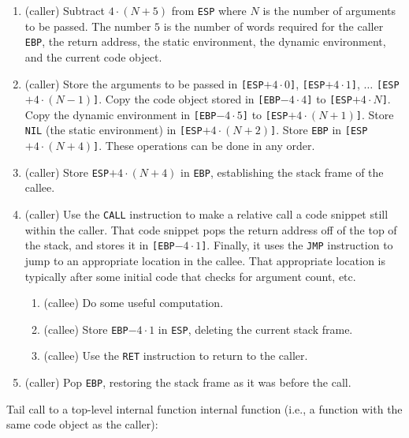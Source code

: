 \begin{enumerate}
\item (caller) Subtract $4 \cdot (N + 5)$ from \texttt{ESP} where $N$
  is the number of arguments to be passed.  The number $5$ is the
  number of words required for the caller \texttt{EBP}, the return
  address, the static environment, the dynamic environment, and the
  current code object.
\item (caller) Store the arguments to be passed in
  \texttt{[ESP$+ 4 \cdot 0$]}, 
  \texttt{[ESP$+ 4 \cdot 1$]}, 
  $\ldots$
  \texttt{[ESP$+ 4 \cdot (N - 1)$]}.
  Copy the code object stored in
  \texttt{[EBP$- 4 \cdot 4$]} to 
  \texttt{[ESP$+ 4 \cdot N$]}.  
  Copy the dynamic environment in 
  \texttt{[EBP$-4 \cdot 5$]} to 
  \texttt{[ESP$+4 \cdot (N + 1)$]}.  
  Store \texttt{NIL} (the static environment) in
  \texttt{[ESP$+4 \cdot (N + 2)$]}.    
  Store \texttt{EBP} in  
  \texttt{[ESP$+4 \cdot (N + 4)$]}.  
  These operations can be done in any order.
\item (caller) Store \texttt{ESP$+4 \cdot (N + 4)$} in \texttt{EBP},
  establishing the stack frame of the callee.
\item (caller) Use the \texttt{CALL} instruction to make a relative
  call a code snippet still within the caller.  That code snippet pops
  the return address off of the top of the stack,
  and stores it in \texttt{[EBP$- 4 \cdot 1$]}.  Finally, it uses the
  \texttt{JMP} instruction to jump to an appropriate location in the
  callee.  That appropriate location is typically after some initial
  code that checks for argument count, etc. 
  \begin{enumerate}
  \item (callee) Do some useful computation.
  \item (callee) Store \texttt{EBP$- 4 \cdot 1$} in \texttt{ESP},
    deleting the current stack frame.
  \item (callee) Use the \texttt{RET} instruction to return to the
    caller.
  \end{enumerate}
\item (caller) Pop \texttt{EBP}, restoring the stack frame as it was
  before the call.
\end{enumerate}

Tail call to a top-level internal function internal function (i.e., a
function with the same code object as the caller):

